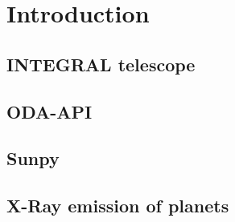 \section{Introduction}
    \subsection{INTEGRAL telescope}
    \subsection{ODA-API}
    \subsection{Sunpy}
    \subsection{X-Ray emission of planets}